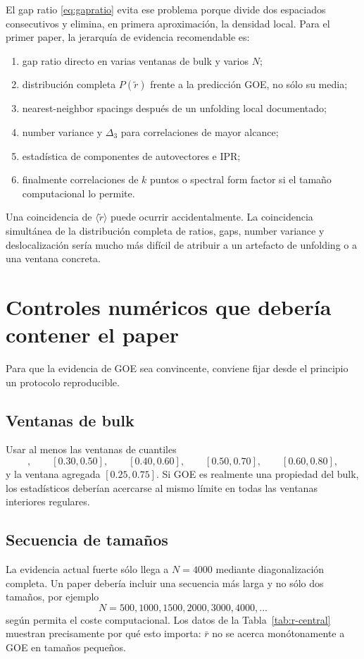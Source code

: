 \documentclass[11pt,a4paper]{article}
\begin{document}
El gap ratio \eqref{eq:gapratio} evita ese problema porque divide dos espaciados consecutivos y elimina, en primera aproximación, la densidad local. Para el primer paper, la jerarquía de evidencia recomendable es:
\begin{enumerate}
\item gap ratio directo en varias ventanas de bulk y varios $N$;
\item distribución completa $P(\widetilde r)$ frente a la predicción GOE, no sólo su media;
\item nearest-neighbor spacings después de un unfolding local documentado;
\item number variance y $\Delta_3$ para correlaciones de mayor alcance;
\item estadística de componentes de autovectores e IPR;
\item finalmente correlaciones de $k$ puntos o spectral form factor si el tamaño computacional lo permite.
\end{enumerate}

Una coincidencia de $\langle\widetilde r\rangle$ puede ocurrir accidentalmente. La coincidencia simultánea de la distribución completa de ratios, gaps, number variance y deslocalización sería mucho más difícil de atribuir a un artefacto de unfolding o a una ventana concreta.

\section{Controles numéricos que debería contener el paper}

Para que la evidencia de GOE sea convincente, conviene fijar desde el principio un protocolo reproducible.

\subsection{Ventanas de bulk}
Usar al menos las ventanas de cuantiles
\begin{equation}
[0.20,0.40],\qquad[0.30,0.50],\qquad[0.40,0.60],\qquad[0.50,0.70],\qquad[0.60,0.80],
\end{equation}
y la ventana agregada $[0.25,0.75]$. Si GOE es realmente una propiedad del bulk, los estadísticos deberían acercarse al mismo límite en todas las ventanas interiores regulares.

\subsection{Secuencia de tamaños}
La evidencia actual fuerte sólo llega a $N=4000$ mediante diagonalización completa. Un paper debería incluir una secuencia más larga y no sólo dos tamaños, por ejemplo
\begin{equation}
N=500,1000,1500,2000,3000,4000,\ldots
\end{equation}
según permita el coste computacional. Los datos de la Tabla~\ref{tab:r-central} muestran precisamente por qué esto importa: $\bar r$ no se acerca monótonamente a GOE en tamaños pequeños.
\end{document}
